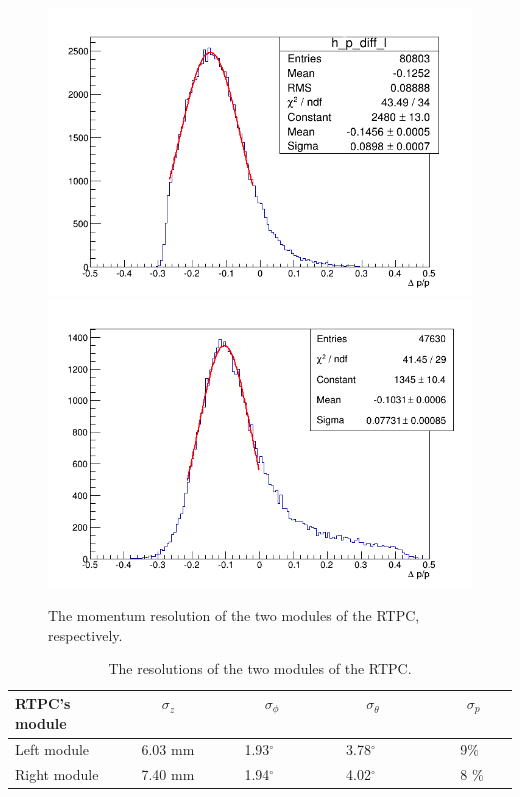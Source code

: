 \begin{figure}[tbp]
\includegraphics[scale=0.31]{fig_rtpc/fit_delta_p_l.png}
\includegraphics[scale=0.31]{fig_rtpc/fit_delta_p_r.png}
\caption{The momentum resolution of the two modules of the RTPC, respectively.}
\label{fig:rtpc_resolution_p}
\end{figure}
 
\begin{table}[tbp]
\begin{center}
\begin{tabular}{|l|l|l|l|l|}
\hline
RTPC's module & ~~~~~~$\sigma_{z}$ ~~~~~~&  ~~~~~~$\sigma_{\phi}$~~~~~~ & ~~~~~~$\sigma_{\theta}$~~~~~~ & ~~~~~~$\sigma_{p}$~~~~~~\\
\hline
Left module &  ~~~~6.03 mm & ~~~~1.93$^{\circ}$ & ~~~~3.78$^{\circ}$ & ~~~~~~9$\%$ \\
\hline
Right module & ~~~~7.40 mm & ~~~~1.94$^{\circ}$ & ~~~~4.02$^{\circ}$  & ~~~~~~8 $\%$\\
\hline
\end{tabular}
\caption{The resolutions of the two modules of the RTPC.}
\label{table:rtpc_resolutions}
\end{center}
\end{table}


